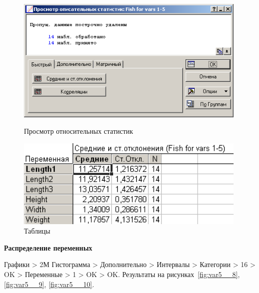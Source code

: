 \begin{figure}[!h]
  \centering
  \begin{minipage}{0.49\textwidth}
    \centering

    \includegraphics[width=0.99\textwidth]
    {inc/var5__6.PNG}

    \caption{Просмотр относительных статистик}
    \label{fig:var5__6}
  \end{minipage}
  \begin{minipage}{0.49\textwidth}
    \centering

    \includegraphics[width=0.99\textwidth]
    {inc/var5__7.PNG}

    \caption{Таблицы}
    \label{fig:var5__7}
  \end{minipage}
\end{figure}

\newpage

\begin{center}
  \textbf{Распределение переменных}
\end{center}

Графики > 2М Гистограмма > Дополнительно > Интервалы > Категории > 16 > OK
> Переменные > 1 > OK > OK. Результаты на рисунках~\ref{fig:var5__8}, \ref{fig:var5__9}, \ref{fig:var5__10}.

